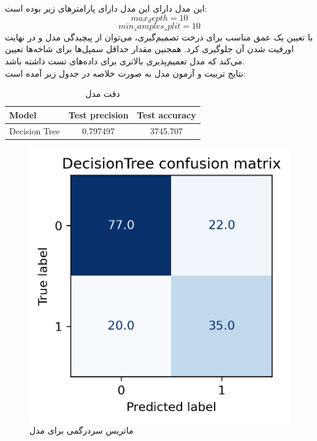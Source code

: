 \documentclass[11pt]{article}
\begin{document}
		\subsection{}
		این مدل دارای این مدل دارای پارامترهای زیر بوده است:
		$$max_depth = 10$$
		$$min_samples_split = 10$$
		با تعیین یک عمق مناسب برای درخت تصمیم‌گیری، می‌توان از پیچیدگی مدل و در نهایت اورفیت شدن آن جلوگیری کرد. همجنین مقدار حداقل سمپل‌ها برای شاخه‌ها تعیین می‌کند که مدل تعمیم‌پذیری بالاتری برای داده‌های تست داشته باشد.\\
		نتایج تربیت و آزمون مدل به صورت خلاصه در جدول زیر آمده است:
		\begin{table}[h!]
			\caption{دقت مدل }
			\begin{latin}
				\centering
				\begin{tabular}{|l|c|c|}
					\hline
					\textbf{Model} & \textbf{Test precision} & \textbf{Test accuracy} \\ \hline
					Decision Tree & 0.797497 & 3745.707 \\ \hline
				\end{tabular}
			\end{latin}
			\label{tab:decisiontree_results}
		\end{table}
		\begin{figure}[!h]
			\centerline{\includegraphics[width=0.5\linewidth]{../HW2_2/DecisionTree confusion.png}}
			\caption{ماتریس سردرگمی برای مدل }
			\label{fig:confusion_decisiontree}
		\end{figure}
		\pagebreak
\end{document}
